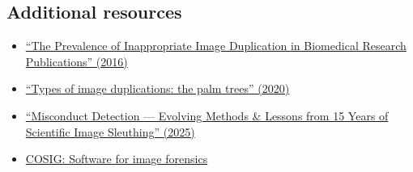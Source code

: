 \documentclass[letterpaper, 12pt]{article}
\begin{document}
\subsection*{Additional resources}

\begin{itemize}
    \setlength\itemsep{-0.5em}
    \item \href{https://doi.org/10.1128/mbio.00809-16}{``The Prevalence of Inappropriate Image Duplication in Biomedical Research Publications'' (2016)}
    \item \href{https://scienceintegritydigest.com/2020/01/08/types-of-image-duplications/}{``Types of image duplications: the palm trees'' (2020)}
    \item \href{https://doi.org/10.1017/jme.2025.32}{``Misconduct Detection — Evolving Methods \& Lessons from 15 Years of Scientific Image Sleuthing'' (2025)}
    \item \href{https://osf.io/g23pf}{COSIG: Software for image forensics}
\end{itemize}
\end{document}
